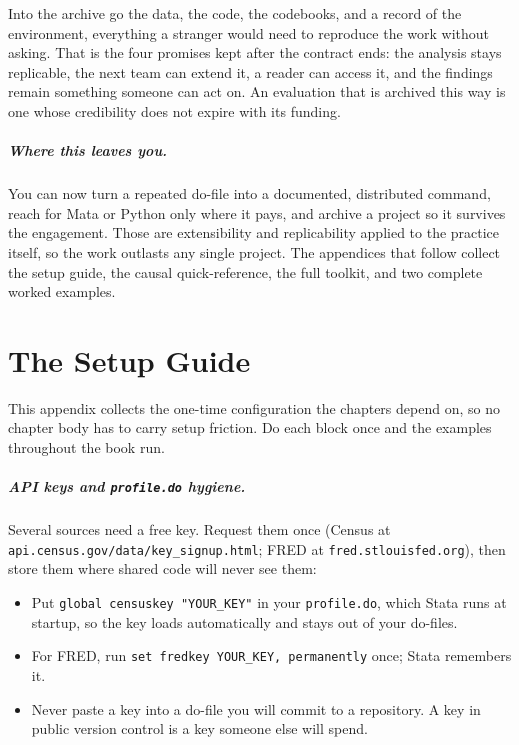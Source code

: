 \documentclass[
    a4paper,
    fontsize=10pt,
    twoside=true,
    numbers=noenddot,
]{kaobook}
\begin{document}
Into the archive go the data, the code, the codebooks, and a record of the environment, everything a stranger would need to reproduce the work without asking. That is the four promises kept after the contract ends: the analysis stays replicable, the next team can extend it, a reader can access it, and the findings remain something someone can act on. An evaluation that is archived this way is one whose credibility does not expire with its funding.

\paragraph{Where this leaves you.} You can now turn a repeated do-file into a documented, distributed command, reach for Mata or Python only where it pays, and archive a project so it survives the engagement. Those are extensibility and replicability applied to the practice itself, so the work outlasts any single project. The appendices that follow collect the setup guide, the causal quick-reference, the full toolkit, and two complete worked examples.


\appendix
{}

\chapter{The Setup Guide}\label{app:setup}
This appendix collects the one-time configuration the chapters depend on, so no chapter body has to carry setup friction. Do each block once and the examples throughout the book run.

\paragraph{API keys and \texttt{profile.do} hygiene.} Several sources need a free key. Request them once (Census at \texttt{api.census.gov/data/key\_signup.html}; FRED at \texttt{fred.stlouisfed.org}), then store them where shared code will never see them:
\begin{itemize}
    \item Put \texttt{global censuskey "YOUR\_KEY"} in your \texttt{profile.do}, which Stata runs at startup, so the key loads automatically and stays out of your do-files.
    \item For FRED, run \texttt{set fredkey YOUR\_KEY, permanently} once; Stata remembers it.
    \item Never paste a key into a do-file you will commit to a repository. A key in public version control is a key someone else will spend.
\end{itemize}
\end{document}

